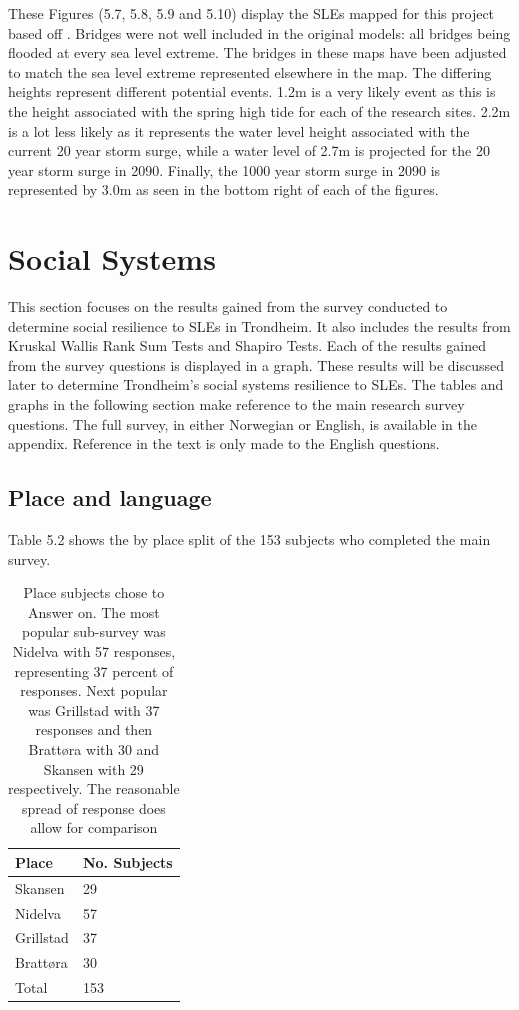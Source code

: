These Figures (5.7, 5.8, 5.9 and 5.10) display the SLEs mapped for this project based off \cite{kartverket_se_2020}. Bridges were not well included in the original models: all bridges being flooded at every sea level extreme. The bridges in these maps have been adjusted to match the sea level extreme represented elsewhere in the map. The differing heights represent different potential events. 1.2m is a very likely event as this is the height associated with the spring high tide for each of the research sites. 2.2m is a lot less likely as it represents the water level height associated with the current 20 year storm surge, while a water level of 2.7m is projected for the 20 year storm surge in 2090. Finally, the 1000 year storm surge in 2090 is represented by 3.0m as seen in the bottom right of each of the figures. 

\section{Social Systems}

This section focuses on the results gained from the survey conducted to determine social resilience to SLEs in Trondheim.  It also includes the results from Kruskal Wallis Rank Sum Tests and Shapiro Tests. Each of the results gained from the survey questions is displayed in a graph. These results will be discussed later to determine Trondheim's social systems resilience to SLEs. The tables and graphs in the following section make reference to the main research survey questions. The full survey, in either Norwegian or English, is available in the appendix. Reference in the text is only made to the English questions. 



\subsection{Place and language}
Table 5.2 shows the by place split of the 153 subjects who completed the main survey. 
\begin{table}[H]
    \centering
    \begin{tabular}{|l|l|}
    \hline
    \textbf{Place}  & \textbf{No. Subjects}  \\ \hline
      Skansen   & 29    \\ \hline
      Nidelva & 57      \\ \hline
      Grillstad & 37       \\ \hline
      Brattøra & 30     \\ \hline
      Total & 153   \\ \hline
     \end{tabular}
    \caption{Place subjects chose to Answer on. The most popular sub-survey was Nidelva with 57 responses, representing 37 percent of responses. Next popular was Grillstad with 37 responses and then Brattøra with 30 and Skansen with 29 respectively. The reasonable spread of response does allow for comparison}
    \label{tab:place}
\end{table}
